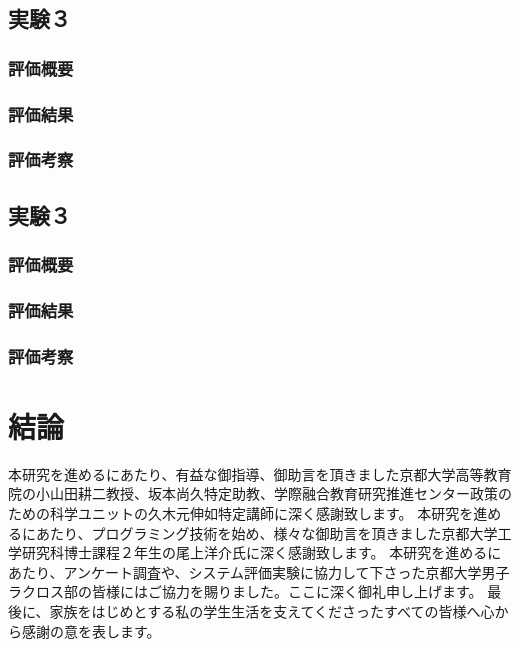 \documentclass[sotsuron]{kuee}
\begin{document}
\section{実験３}
\subsection{評価概要}
\subsection{評価結果}
\subsection{評価考察}
\section{実験３}
\subsection{評価概要}
\subsection{評価結果}
\subsection{評価考察}

\chapter{結論}


\begin{acknowledgements}
 本研究を進めるにあたり、有益な御指導、御助言を頂きました京都大学高等教育院の小山田耕二教授、坂本尚久特定助教、学際融合教育研究推進センター政策のための科学ユニットの久木元伸如特定講師に深く感謝致します。
本研究を進めるにあたり、プログラミング技術を始め、様々な御助言を頂きました京都大学工学研究科博士課程２年生の尾上洋介氏に深く感謝致します。
本研究を進めるにあたり、アンケート調査や、システム評価実験に協力して下さった京都大学男子ラクロス部の皆様にはご協力を賜りました。ここに深く御礼申し上げます。
最後に、家族をはじめとする私の学生生活を支えてくださったすべての皆様へ心から感謝の意を表します。
\end{acknowledgements}








\appendix
\end{document}
